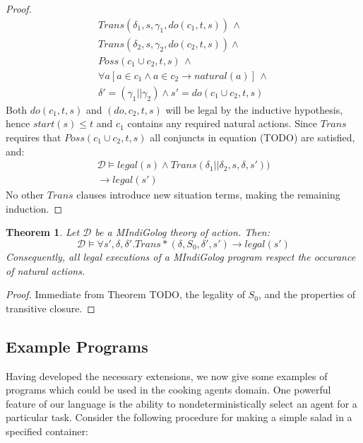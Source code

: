 \documentclass[letterpaper]{article}
\newtheorem{theorem}{Theorem}
\begin{document}
\begin{proof}
\begin{multline*}
Trans(\delta_{1},s,\gamma_{1},do(c_{1},t,s))\,\wedge\\
Trans(\delta_{2},s,\gamma_{2},do(c_{2},t,s))\wedge\\
Poss(c_{1}\cup c_{2},t,s)\,\wedge\\
\forall a\left[a\in c_{1}\wedge a\in c_{2}\rightarrow natural(a)\right]\,\wedge\\
\delta'=(\gamma_{1}||\gamma_{2})\wedge s'=do(c_{1}\cup c_{2},t,s)
\end{multline*}
Both $do(c_1,t,s)$ and $(do,c_2,t,s)$ will be legal by the inductive hypothesis,
hence $start(s) \leq t$ and $c_1$ contains any required natural actions.
Since $Trans$ requires that $Poss(c_1 \cup c_2,t,s)$ all conjuncts in
equation (TODO) are satisfied, and:
\begin{multline*}
\mathcal{D} \models legal(s) \wedge Trans(\delta_1 || \delta_2,s,\delta,s'))\\
\rightarrow legal(s')
\end{multline*}
No other $Trans$ clauses introduce new situation terms, making
the remaining induction.
\end{proof}


\begin{theorem}
Let $\mathcal{D}$ be a MIndiGolog theory of action. Then:
\begin{equation*}
\mathcal{D} \models \forall s',\delta,\delta'. Trans*(\delta,S_0,\delta',s')
\rightarrow legal(s')
\end{equation*}
Consequently, all legal executions of a MIndiGolog program respect
the occurance of natural actions.
\end{theorem}

\begin{proof}
Immediate from Theorem TODO, the legality of $S_0$, and the properties
of transitive closure.
\end{proof}


\subsection{Example Programs}

Having developed the necessary extensions, we now give some examples
of programs which could be used in the cooking agents domain. One
powerful feature of our language is the ability to nondeterministically
select an agent for a particular task. Consider the following procedure
for making a simple salad in a specified container:
\end{document}
